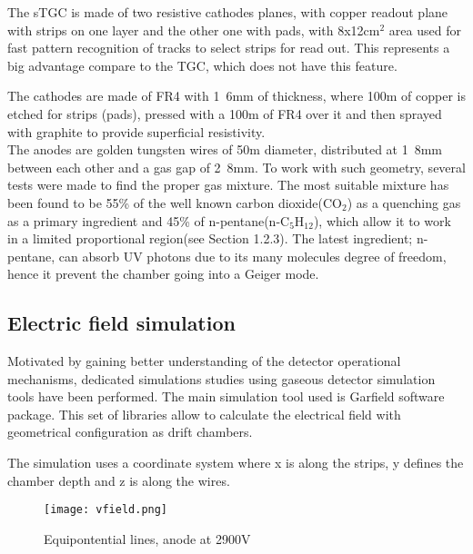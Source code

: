 The sTGC is made of two resistive cathodes planes, with copper readout plane with strips on one layer and the other one
with pads, with \unit{8x12}{cm$^2$} area used for fast pattern recognition of tracks to select strips for read out. This
represents a big
advantage compare to the TGC, which does not have this feature.\par
The cathodes are made of FR4 with \unit{1.6}{mm} of thickness, where \si{100}{\micro m} of copper is etched for strips
(pads), pressed with a \unit{100}{\micro m} of FR4 over it and then sprayed with graphite to provide superficial resistivity.\\
The anodes are golden tungsten wires of \unit{50}{\micro m} diameter,
distributed at \unit{1.8}{mm} between each other and a gas gap of \unit{2.8}{mm}. To work with such geometry, several
tests were made to find the proper gas
mixture\cite{gaschoice}. The most suitable mixture has been found to be 55\% of the well known carbon dioxide(CO$_2$)
as a quenching gas as a primary ingredient and 45\% of n-pentane(n-C$_5$H$_{12}$), which allow it to work in a limited
proportional region\cite{driftbook}(see Section 1.2.3). 
The latest ingredient; n-pentane, can absorb UV photons due to its many molecules degree of freedom,
hence it prevent the chamber going into a Geiger mode.\par 




\subsection{Electric field simulation}

Motivated by gaining better understanding of the detector operational mechanisms, dedicated simulations studies using
gaseous detector simulation tools have been performed. The main simulation tool used is Garfield
\cite{garfield2,garfield1} software package. This set of libraries allow to calculate the electrical field with
geometrical configuration as drift chambers.\par
The simulation uses a coordinate system where x is along the strips, y defines the chamber depth and z is along the
wires.\par

\begin{figure}[ht]
	\centering
	\texttt{[image: vfield.png]}
	\caption{Equipontential lines, anode at 2900V}\label{fig:vfield}
\end{figure}

